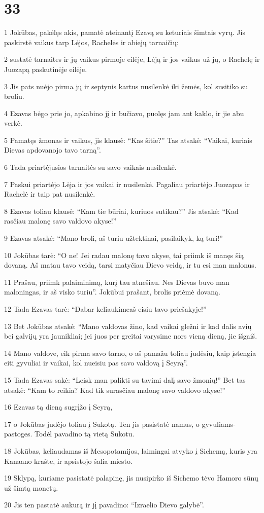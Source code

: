 \chapter{33}

\par 1 Jokūbas, pakėlęs akis, pamatė ateinantį Ezavą su keturiais šimtais vyrų. Jis paskirstė vaikus tarp Lėjos, Rachelės ir abiejų tarnaičių: 
\par 2 sustatė tarnaites ir jų vaikus pirmoje eilėje, Lėją ir jos vaikus už jų, o Rachelę ir Juozapą paskutinėje eilėje. 
\par 3 Jis pats nuėjo pirma jų ir septynis kartus nusilenkė iki žemės, kol susitiko su broliu. 
\par 4 Ezavas bėgo prie jo, apkabino jį ir bučiavo, puolęs jam ant kaklo, ir jie abu verkė. 
\par 5 Pamatęs žmonas ir vaikus, jis klausė: “Kas šitie?” Tas atsakė: “Vaikai, kuriais Dievas apdovanojo tavo tarną”. 
\par 6 Tada priartėjusios tarnaitės su savo vaikais nusilenkė. 
\par 7 Paskui priartėjo Lėja ir jos vaikai ir nusilenkė. Pagaliau priartėjo Juozapas ir Rachelė ir taip pat nusilenkė. 
\par 8 Ezavas toliau klausė: “Kam tie būriai, kuriuos sutikau?” Jis atsakė: “Kad rasčiau malonę savo valdovo akyse!” 
\par 9 Ezavas atsakė: “Mano broli, aš turiu užtektinai, pasilaikyk, ką turi!” 
\par 10 Jokūbas tarė: “O ne! Jei radau malonę tavo akyse, tai priimk iš manęs šią dovaną. Aš matau tavo veidą, tarsi matyčiau Dievo veidą, ir tu esi man malonus. 
\par 11 Prašau, priimk palaiminimą, kurį tau atnešiau. Nes Dievas buvo man maloningas, ir aš visko turiu”. Jokūbui prašant, brolis priėmė dovaną. 
\par 12 Tada Ezavas tarė: “Dabar keliaukime­aš eisiu tavo priešakyje!” 
\par 13 Bet Jokūbas atsakė: “Mano valdovas žino, kad vaikai gležni ir kad dalis avių bei galvijų yra jaunikliai; jei juos per greitai varysime nors vieną dieną, jie išgaiš. 
\par 14 Mano valdove, eik pirma savo tarno, o aš pamažu toliau judėsiu, kaip įstengia eiti gyvuliai ir vaikai, kol nueisiu pas savo valdovą į Seyrą”. 
\par 15 Tada Ezavas sakė: “Leisk man palikti su tavimi dalį savo žmonių!” Bet tas atsakė: “Kam to reikia? Kad tik surasčiau malonę savo valdovo akyse!” 
\par 16 Ezavas tą dieną sugrįžo į Seyrą, 
\par 17 o Jokūbas judėjo toliau į Sukotą. Ten jis pasistatė namus, o gyvuliams­ pastoges. Todėl pavadino tą vietą Sukotu. 
\par 18 Jokūbas, keliaudamas iš Mesopotamijos, laimingai atvyko į Sichemą, kuris yra Kanaano krašte, ir apsistojo šalia miesto. 
\par 19 Sklypą, kuriame pasistatė palapinę, jis nusipirko iš Sichemo tėvo Hamoro sūnų už šimtą monetų. 
\par 20 Jis ten pastatė aukurą ir jį pavadino: “Izraelio Dievo galybė”.



